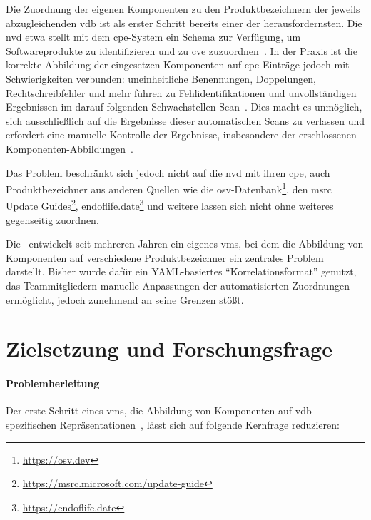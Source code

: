 Die Zuordnung der eigenen Komponenten zu den Produktbezeichnern der jeweils abzugleichenden \acrshort{vdb} ist als erster Schritt bereits einer der herausfordernsten.
Die \acrshort{nvd} etwa stellt mit dem \acrfull{cpe}-System ein Schema zur Verfügung, um Softwareprodukte zu identifizieren und zu \acrshort{cve} zuzuordnen\ \autocite{Cheikes_Waltermire_Scarfone_2011}.
In der Praxis ist die korrekte Abbildung der eingesetzen Komponenten auf \acrshort{cpe}-Einträge jedoch mit Schwierigkeiten verbunden:
uneinheitliche Benennungen, Doppelungen, Rechtschreibfehler und mehr führen zu Fehlidentifikationen und unvollständigen Ergebnissen im darauf folgenden Schwachstellen-Scan\ \autocite{Sanguino_Uetz_2017}.
Dies macht es unmöglich, sich ausschließlich auf die Ergebnisse dieser automatischen Scans zu verlassen und erfordert eine manuelle Kontrolle der Ergebnisse, insbesondere der erschlossenen Komponenten-Abbildungen\ \autocite{Sanguino_Uetz_2017}.

Das Problem beschränkt sich jedoch nicht auf die \acrshort{nvd} mit ihren \acrshort{cpe}, auch Produktbezeichner aus anderen Quellen wie die \acrfull{osv}-Datenbank\footnote{\url{https://osv.dev}}, den \acrfull{msrc} Update Guides\footnote{\url{https://msrc.microsoft.com/update-guide}}, endoflife.date\footnote{\url{https://endoflife.date}} und weitere lassen sich nicht ohne weiteres gegenseitig zuordnen.

Die \metaeffekt\ entwickelt seit mehreren Jahren ein eigenes \acrshort{vms}, bei dem die Abbildung von Komponenten auf verschiedene Produktbezeichner ein zentrales Problem darstellt.
Bisher wurde dafür ein YAML-basiertes \enquote{Korrelationsformat} genutzt, das Teammitgliedern manuelle Anpassungen der automatisierten Zuordnungen ermöglicht, jedoch zunehmend an seine Grenzen stößt.


\section{Zielsetzung und Forschungsfrage}\label{sec:ziel-forschungsfrage}

\paragraph{Problemherleitung}

Der erste Schritt eines \acrshort{vms}, die Abbildung von Komponenten auf \acrshort{vdb}-spezifischen Repräsentationen\ \autocite{Idrissi_Sebai_Faroukhi_Mahouachi_2024}, lässt sich auf folgende Kernfrage reduzieren:

